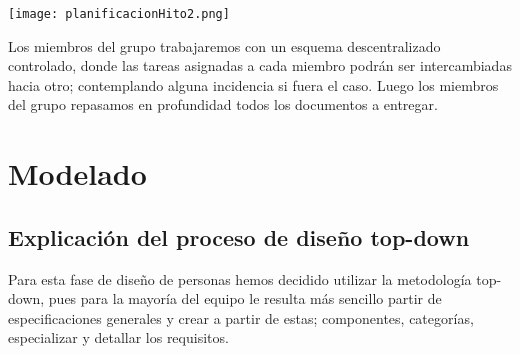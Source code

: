 \documentclass[12pt]{article}
\begin{document}
\begin{center}
	\texttt{[image: planificacionHito2.png]}
\end{center}
\phantom{10}

Los miembros del grupo trabajaremos con un esquema descentralizado controlado, donde las tareas asignadas a cada miembro podrán ser intercambiadas hacia otro; contemplando alguna incidencia si fuera el caso. Luego los miembros del grupo repasamos en profundidad todos los documentos a entregar.



\section{Modelado}

\subsection{Explicación del proceso de diseño top-down}

Para esta fase de diseño de personas hemos decidido utilizar la metodología top-down, pues para la mayoría del equipo le resulta más sencillo partir de especificaciones generales y crear a partir de estas; componentes, categorías, especializar y detallar los requisitos.
\end{document}
